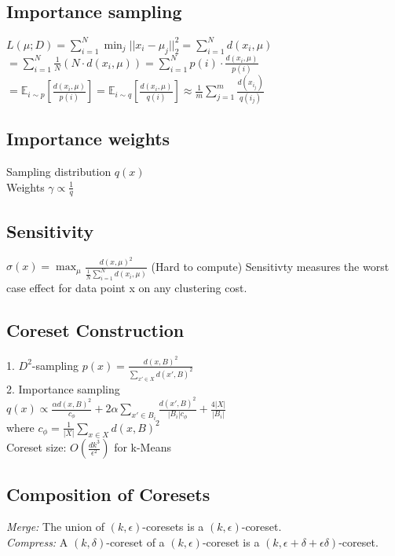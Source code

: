 \subsection*{Importance sampling}
$L(\mu;D) = \sum_{i=1}^N \min_j ||x_i-\mu_j||^2_2 = \sum_{i=1}^N d(x_i,\mu)$\\
$=\sum_{i=1}^N \frac{1}{N} (N\cdot d(x_i,\mu)) = \sum_{i=1}^N p(i) \cdot \frac{d(x_i,\mu)}{p(i)}$\\
$= \mathbb{E}_{i \sim p}\left [ \frac{d(x_i,\mu)}{p(i)} \right ] = \mathbb{E}_{i \sim q}\left [ \frac{d(x_i,\mu)}{q(i)} \right ] \approx \frac{1}{m} \sum_{j=1}^m \frac{d(x_{i_j})}{q(i_j)}$

\subsection*{Importance weights}
Sampling distribution $q(x)$\\
Weights $\gamma \propto \frac{1}{q}$

\subsection*{Sensitivity}
$\sigma (x) = \max_\mu \frac{d(x,\mu)^2}{\frac{1}{N} \sum_{i=1}^N d(x_i, \mu)}$ (Hard to compute)
Sensitivty measures the worst case effect for data point x on any clustering cost.

\subsection*{Coreset Construction}
1. $D^2$-sampling $p(x) = \frac{d(x,B)^2}{\sum_{x' \in X} d(x',B)^2}$\\
2. Importance sampling\\
$q(x) \propto \frac{\alpha d(x,B)^2}{c_\phi} + 2 \alpha \sum_{x' \in B_i} \frac{d(x',B)^2}{|B_i| c_\phi} + \frac{4 |X|}{|B_i|}$\\
where $c_\phi = \frac{1}{|X|} \sum_{x \in X} d(x,B)^2$\\
Coreset size: $O(\frac{dk^3}{\epsilon^2})$ for k-Means

\subsection*{Composition of Coresets}
\emph{Merge:} The union of $(k,\epsilon)$-coresets is a $(k,\epsilon)$-coreset.\\
\emph{Compress:} A $(k,\delta)$-coreset of a $(k,\epsilon)$-coreset is a $(k,\epsilon + \delta + \epsilon\delta)$-coreset.